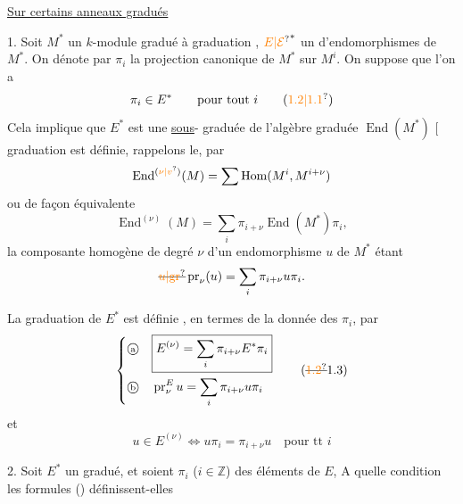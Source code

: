
\uline{Sur certains anneaux gradués}


1. Soit  $M^*$ un $k$-module gradué  à graduation , $\unsure{E|\mathcal E}^*$ un   d'endomorphismes  de $M^*$. On dénote par $\pi_i$ la projection canonique de $M^*$ sur $M^i$.  On suppose que l'on a
\[
 \pi_i\in E^* \qquad \text{pour tout }i
 \tag*{(\unsure{1.2|1.1})}
\]
Cela implique que $E^*$ est une \uline{sous}-  graduée de l'algèbre graduée  $\operatorname{End}(M^*)$ [ graduation est définie, rappelons le, par
\[
 \operatorname{End}^{(\unsure{\nu|v})}(M)=\sum\operatorname{Hom}(M^i,M^{i+\nu})
\]
ou de façon équivalente
\[
 \operatorname{End}^{(\nu)}(M)=\sum_i\pi_{i+\nu}\operatorname{End}(M^*)\pi_i,
\]
la composante homogène de degré $\nu$ d'un endomorphisme $u$ de $M^*$ étant
\[
 \deleted{\unsure{u|\mathrm{gr}}}\operatorname{pr}_{\nu}(u)=\sum_i\pi_{i+\nu}u\pi_i .
\]

La graduation de $E^*$ est définie , en termes de la  donnée des $\pi_i$, par
\[
\left\{\begin{aligned}
 \text{\textcircled{\scriptsize a}}\quad &\boxed{E^{(\nu)}=\sum_i\pi_{i+\nu}E^*\pi_i}\\
 \text{\textcircled{\scriptsize b}}\quad &\operatorname{pr}^{E}_{\nu}u=\sum_i\pi_{i+\nu}u\pi_i
\end{aligned}\right.
\tag*{(\deleted{\unsure{1.2}}1.3)}
\]
et
\[
 u\in E^{(\nu)}\iff u\pi_i=\pi_{i+\nu}u\quad\text{pour tt } i
 \tag*{(1.4.)}
\]

2. Soit $E^*$ un   gradué, et soient $\pi_i$ ($i\in\mathbb Z$) des éléments de $E$,  A quelle condition les formules () définissent-elles

